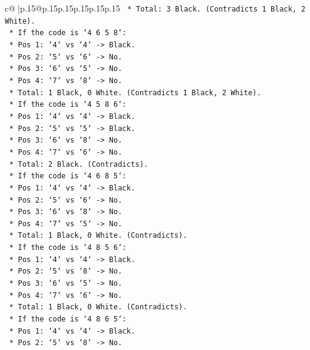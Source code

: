 \documentclass{article}
\begin{document}
{\begin{supertabular}{c@{$\;$}|p{.15\linewidth}@{}p{.15\linewidth}p{.15\linewidth}p{.15\linewidth}p{.15\linewidth}p{.15\linewidth}}
{{{\texttt{        *   Total: 3 Black. (Contradicts 1 Black, 2 White).} \\
\texttt{    *   If the code is `4 6 5 8`:} \\
\texttt{        *   Pos 1: `4` vs `4` {-}> Black.} \\
\texttt{        *   Pos 2: `5` vs `6` {-}> No.} \\
\texttt{        *   Pos 3: `6` vs `5` {-}> No.} \\
\texttt{        *   Pos 4: `7` vs `8` {-}> No.} \\
\texttt{        *   Total: 1 Black, 0 White. (Contradicts 1 Black, 2 White).} \\
\texttt{    *   If the code is `4 5 8 6`:} \\
\texttt{        *   Pos 1: `4` vs `4` {-}> Black.} \\
\texttt{        *   Pos 2: `5` vs `5` {-}> Black.} \\
\texttt{        *   Pos 3: `6` vs `8` {-}> No.} \\
\texttt{        *   Pos 4: `7` vs `6` {-}> No.} \\
\texttt{        *   Total: 2 Black. (Contradicts).} \\
\texttt{    *   If the code is `4 6 8 5`:} \\
\texttt{        *   Pos 1: `4` vs `4` {-}> Black.} \\
\texttt{        *   Pos 2: `5` vs `6` {-}> No.} \\
\texttt{        *   Pos 3: `6` vs `8` {-}> No.} \\
\texttt{        *   Pos 4: `7` vs `5` {-}> No.} \\
\texttt{        *   Total: 1 Black, 0 White. (Contradicts).} \\
\texttt{    *   If the code is `4 8 5 6`:} \\
\texttt{        *   Pos 1: `4` vs `4` {-}> Black.} \\
\texttt{        *   Pos 2: `5` vs `8` {-}> No.} \\
\texttt{        *   Pos 3: `6` vs `5` {-}> No.} \\
\texttt{        *   Pos 4: `7` vs `6` {-}> No.} \\
\texttt{        *   Total: 1 Black, 0 White. (Contradicts).} \\
\texttt{    *   If the code is `4 8 6 5`:} \\
\texttt{        *   Pos 1: `4` vs `4` {-}> Black.} \\
\texttt{        *   Pos 2: `5` vs `8` {-}> No.} \\
}}}
\end{supertabular}}
\end{document}
